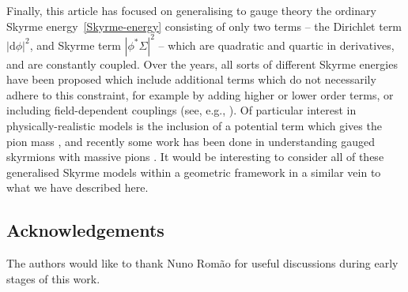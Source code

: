 \documentclass[pdftex]{sigma}
\newcommand{\1}{{\mathbb{1}}}
\def \d{\mathrm{d}}
\numberwithin{equation}{section}
\begin{document}
Finally, this article has focused on generalising to gauge theory the ordinary Skyrme energy~\eqref{Skyrme-energy} consisting of only two terms -- the Dirichlet term $|\d\phi|^2$, and Skyrme term $|\phi^\ast\Sigma|^2$ -- which are quadratic and quartic in derivatives, and are constantly coupled. Over the years, all sorts of different Skyrme energies have been proposed which include additional terms which do not necessarily adhere to this constraint, for example by adding higher or lower order terms, or including field-dependent couplings (see, e.g., \cite{AdamOlesWereszczynski2020dielectric,AdamSanchez-GuillenWereszczynski2010sexticmodel,GudnasonNitta2015baryonic,harland2014topological}). Of particular interest in physically-realistic models is the inclusion of a potential term which gives the pion mass \cite{adkinsNappi1984pionmass}, and recently some work has been done in understanding gauged skyrmions with massive pions \cite{LivramentoRaduShnir2023solitons}. It would be interesting to consider all of these generalised Skyrme models within a geometric framework in a similar vein to what we have described here.
\subsection*{Acknowledgements}
The authors would like to thank Nuno Rom\~ao for useful discussions during early stages of this work.
\end{document}
